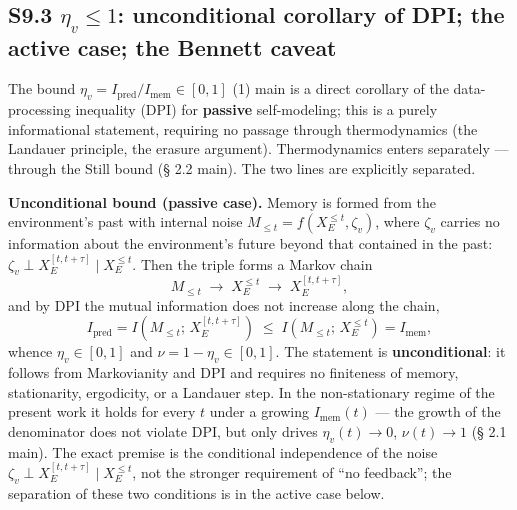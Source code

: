 \documentclass[pdflatex,sn-mathphys-ay]{sn-jnl}
\begin{document}
\subsection*{\texorpdfstring{S9.3 \(\eta_v \le 1\): unconditional corollary of DPI; the active case; the Bennett caveat}{S9.3 \textbackslash eta\_v \textbackslash le 1: unconditional corollary of DPI; the active case; the Bennett caveat}}\label{s9.3-eta_v-le-1-unconditional-corollary-of-dpi-the-active-case-the-bennett-caveat}



The bound \(\eta_v = I_{\text{pred}}/I_{\text{mem}} \in [0,1]\) (1) main is a direct corollary of the data-processing inequality (DPI) for \textbf{passive} self-modeling; this is a purely informational statement, requiring no passage through thermodynamics (the Landauer principle, the erasure argument). Thermodynamics enters separately --- through the Still bound (§ 2.2 main). The two lines are explicitly separated.



\textbf{Unconditional bound (passive case).} Memory is formed from the environment's past with internal noise \(M_{\le t} = f(X_E^{\le t}, \zeta_v)\), where \(\zeta_v\) carries no information about the environment's future beyond that contained in the past: \(\zeta_v \perp X_E^{[t,t+\tau]} \mid X_E^{\le t}\). Then the triple forms a Markov chain \[M_{\le t} \;\to\; X_E^{\le t} \;\to\; X_E^{[t,t+\tau]},\] and by DPI the mutual information does not increase along the chain, \[I_{\text{pred}} = I\!\left(M_{\le t};\, X_E^{[t,t+\tau]}\right) \;\le\; I\!\left(M_{\le t};\, X_E^{\le t}\right) = I_{\text{mem}},\] whence \(\eta_v \in [0,1]\) and \(\nu = 1 - \eta_v \in [0,1]\). The statement is \textbf{unconditional}: it follows from Markovianity and DPI and requires no finiteness of memory, stationarity, ergodicity, or a Landauer step. In the non-stationary regime of the present work it holds for every \(t\) under a growing \(I_{\text{mem}}(t)\) --- the growth of the denominator does not violate DPI, but only drives \(\eta_v(t) \to 0\), \(\nu(t) \to 1\) (§ 2.1 main). The exact premise is the conditional independence of the noise \(\zeta_v \perp X_E^{[t,t+\tau]} \mid X_E^{\le t}\), not the stronger requirement of ``no feedback''; the separation of these two conditions is in the active case below.
\end{document}
